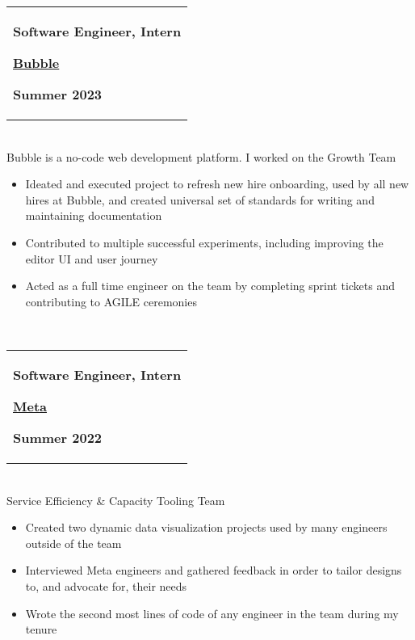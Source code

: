 \documentclass[10pt]{article}
\begin{document}
\begin{tabular}{@{}p{\textwidth}}\begin{minipage}[t]{0.333\textwidth}
\raggedright
\textbf{Software Engineer, Intern}
\end{minipage}%
\begin{minipage}[t]{0.333\textwidth}
\centering
\textbf{\underline{Bubble}}
\end{minipage}%
\begin{minipage}[t]{0.333\textwidth}
\raggedleft
\textbf{Summer 2023}
\end{minipage}%
\end{tabular}\\[0.5ex]
Bubble is a no-code web development platform. I worked on the Growth Team\\ 
\vspace{-\baselineskip}
\begin{itemize}[itemsep=0pt, topsep=0pt]
\item Ideated and executed project to refresh new hire onboarding, used by all new hires at Bubble, and created universal set of standards for writing and maintaining documentation
\item Contributed to multiple successful experiments, including improving the editor UI and user journey
\item Acted as a full time engineer on the team by completing sprint tickets and contributing to AGILE ceremonies
\end{itemize}~\\[-1ex]
\begin{tabular}{@{}p{\textwidth}}\begin{minipage}[t]{0.333\textwidth}
\raggedright
\textbf{Software Engineer, Intern}
\end{minipage}%
\begin{minipage}[t]{0.333\textwidth}
\centering
\textbf{\underline{Meta}}
\end{minipage}%
\begin{minipage}[t]{0.333\textwidth}
\raggedleft
\textbf{Summer 2022}
\end{minipage}%
\end{tabular}\\[0.5ex]
Service Efficiency \& Capacity Tooling Team\\ 
\vspace{-\baselineskip}
\begin{itemize}[itemsep=0pt, topsep=0pt]
\item Created two dynamic data visualization projects used by many engineers outside of the team
\item Interviewed Meta engineers and gathered feedback in order to tailor designs to, and advocate for, their needs
\item Wrote the second most lines of code of any engineer in the team during my tenure
\end{itemize}~\\[-1ex]
\end{document}
